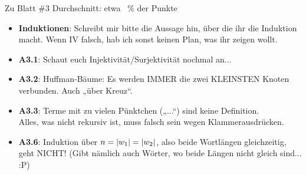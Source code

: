



\morescalingdelimiters



\begin{frame}{Zu Blatt \#3}
	Durchschnitt: \quad etwa ~\% der Punkte \\
	\begin{itemize}
		\item \textbf{Induktionen}: Schreibt mir bitte die Aussage hin, über die ihr die Induktion macht. Wenn IV falsch, hab ich sonst keinen Plan, was ihr zeigen wollt.
		\item \textbf{A3.1}: Schaut euch Injektivität/Surjektivität nochmal an...
		\item \textbf{A3.2}: Huffman-Bäume: Es werden IMMER die zwei KLEINSTEN Knoten verbunden. Auch „über Kreuz“. 
		\item \textbf{A3.3}: Terme mit zu vielen Pünktchen („...“) sind keine Definition. \\ Alles, was nicht rekursiv ist, muss falsch sein wegen Klammerausdrücken.
		\item \textbf{A3.6}: Induktion über $n = \left\lvert w_1 \right\rvert = \left\lvert w_2 \right\rvert$, also beide Wortlängen gleichzeitig, geht NICHT! (Gibt nämlich auch Wörter, wo beide Längen nicht gleich sind... :P)
		
	\end{itemize}
\end{frame}

\framePrevEpisode

\daniel{
	
}



